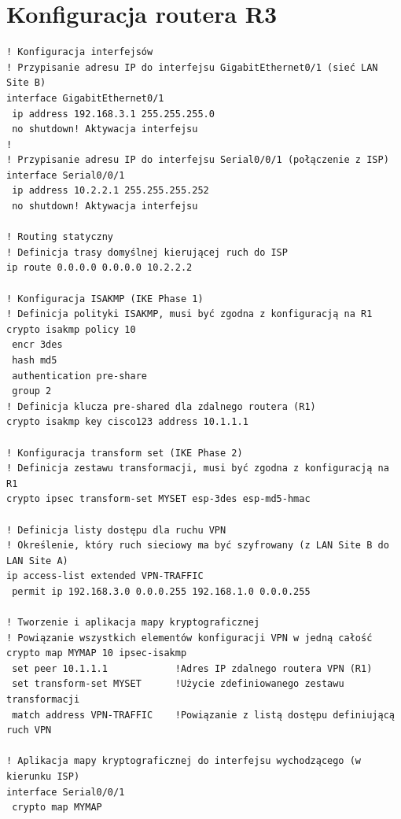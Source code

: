 \documentclass[12pt,twoside,a4paper,openany]{article}
\begin{document}
\section{Konfiguracja routera R3}
\begin{lstlisting}[caption={Konfiguracja podstawowa i VPN na R3}]
! Konfiguracja interfejsów
! Przypisanie adresu IP do interfejsu GigabitEthernet0/1 (sieć LAN Site B)
interface GigabitEthernet0/1
 ip address 192.168.3.1 255.255.255.0
 no shutdown! Aktywacja interfejsu
!
! Przypisanie adresu IP do interfejsu Serial0/0/1 (połączenie z ISP)
interface Serial0/0/1
 ip address 10.2.2.1 255.255.255.252
 no shutdown! Aktywacja interfejsu

! Routing statyczny
! Definicja trasy domyślnej kierującej ruch do ISP
ip route 0.0.0.0 0.0.0.0 10.2.2.2

! Konfiguracja ISAKMP (IKE Phase 1)
! Definicja polityki ISAKMP, musi być zgodna z konfiguracją na R1
crypto isakmp policy 10
 encr 3des
 hash md5
 authentication pre-share
 group 2
! Definicja klucza pre-shared dla zdalnego routera (R1)
crypto isakmp key cisco123 address 10.1.1.1

! Konfiguracja transform set (IKE Phase 2)
! Definicja zestawu transformacji, musi być zgodna z konfiguracją na R1
crypto ipsec transform-set MYSET esp-3des esp-md5-hmac

! Definicja listy dostępu dla ruchu VPN
! Określenie, który ruch sieciowy ma być szyfrowany (z LAN Site B do LAN Site A)
ip access-list extended VPN-TRAFFIC
 permit ip 192.168.3.0 0.0.0.255 192.168.1.0 0.0.0.255

! Tworzenie i aplikacja mapy kryptograficznej
! Powiązanie wszystkich elementów konfiguracji VPN w jedną całość
crypto map MYMAP 10 ipsec-isakmp
 set peer 10.1.1.1            !Adres IP zdalnego routera VPN (R1)
 set transform-set MYSET      !Użycie zdefiniowanego zestawu transformacji
 match address VPN-TRAFFIC    !Powiązanie z listą dostępu definiującą ruch VPN

! Aplikacja mapy kryptograficznej do interfejsu wychodzącego (w kierunku ISP)
interface Serial0/0/1
 crypto map MYMAP
\end{lstlisting}

\end{document}
